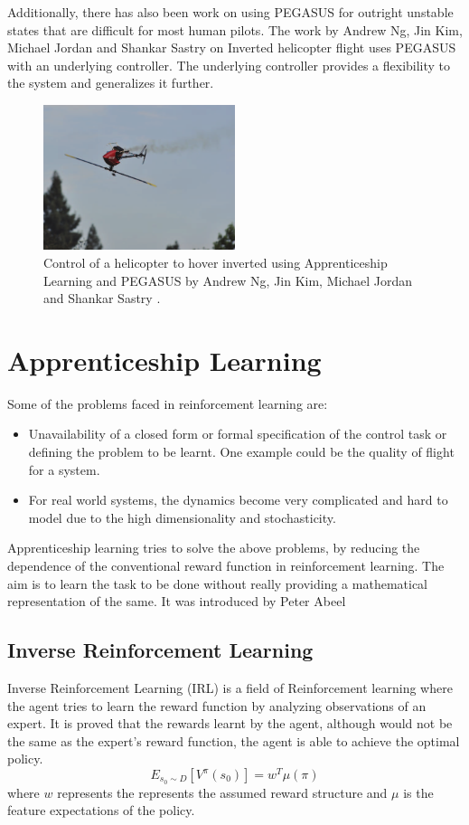 \documentclass[hidelinks,BTech]{iitmdiss}
\begin{document}
Additionally, there has also been work on using PEGASUS for outright unstable states that are difficult for most human pilots. The work by Andrew Ng, Jin Kim, Michael Jordan and Shankar Sastry on Inverted helicopter flight \cite{InvertedHelicopterFlight} uses PEGASUS with an underlying controller. The underlying controller provides a flexibility to the system and generalizes it further.

\begin{figure}[H]
  \centering
    \includegraphics[width=0.5\textwidth]{pegasus_inverted_helicopter.png}
    \caption{Control of a helicopter to hover inverted using Apprenticeship Learning and PEGASUS by Andrew Ng, Jin Kim, Michael Jordan and Shankar Sastry \cite{InvertedHelicopterFlight}.}
\end{figure}

\section{Apprenticeship Learning}
Some of the problems faced in reinforcement learning are: 
\begin{itemize}
	\item Unavailability of a closed form or formal specification of the control task or defining the problem to be learnt. One example could be the quality of flight for a system. 
	\item For real world systems, the dynamics become very complicated and hard to model due to the high dimensionality and stochasticity.
\end{itemize}
Apprenticeship learning tries to solve the above problems, by reducing the dependence of the conventional reward function in reinforcement learning. The aim is to learn the task to be done without really providing a mathematical representation of the same. It was introduced by Peter Abeel\cite{ApprenticeshipLearningThesis} 

\subsection{Inverse Reinforcement Learning}
Inverse Reinforcement Learning\cite{InverseRL} (IRL) is a field of Reinforcement learning where the agent tries to learn the reward function by analyzing observations of an expert. It is proved that  the rewards learnt by the agent, although would not be the same as the expert's reward function, the agent is able to achieve the optimal policy.
\begin{equation}
E_{s_0 \sim D}[V^\pi(s_0)] = w^T \mu(\pi)
\end{equation}
where $w$ represents the represents the assumed reward structure and $\mu$ is the feature expectations of the policy. 
\end{document}
